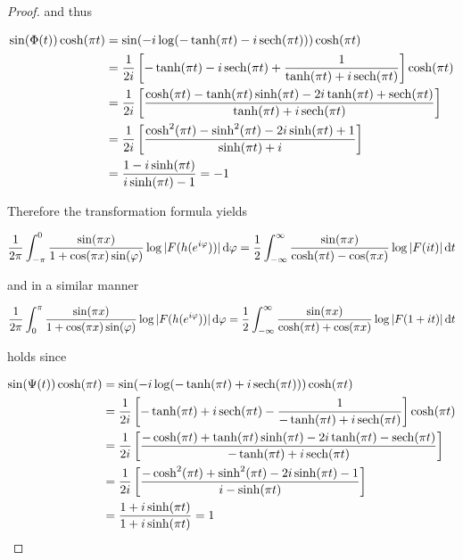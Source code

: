 \begin{proof}
\noindent and thus

\begin{gather*}
	\begin{aligned}
		\sin( \Phi(t) )\cosh(\pi t) &= \sin( -i\log( -\tanh (\pi t) - i \sech(\pi t) )) \cosh(\pi t)\\
		&= \frac{1}{2i} \sbr[3]{ -\tanh(\pi t) - i\sech(\pi t) + \frac{1}{\tanh(\pi t) + i\sech(\pi t) }}\cosh(\pi t)\\
		&= \frac{1}{2i} \sbr[3]{ \frac{\cosh(\pi t) - \tanh(\pi t) \sinh(\pi t) - 2i\tanh(\pi t) + \sech(\pi t)}{\tanh(\pi t) + i\sech(\pi t)}}\\
		&= \frac{1}{2i} \sbr[3]{ \frac{\cosh^2(\pi t) - \sinh^2(\pi t) - 2i \sinh(\pi t) + 1}{\sinh(\pi t) + i}}\\
		&= \frac{1 - i\sinh(\pi t)}{i\sinh(\pi t) - 1} = -1
	\end{aligned}
\end{gather*}

Therefore the transformation formula yields

\begin{equation*}
	\frac{1}{2\pi} \int_{-\pi}^0 \frac{\sin(\pi x)}{1 + \cos(\pi x)\sin(\varphi)} \log \abs[0]{ F(h(e^{i\varphi}))} \d\varphi = \frac{1}{2}\int_{-\infty}^\infty\frac{\sin(\pi x)}{\cosh(\pi t) - \cos(\pi x)} \log\abs[0]{ F(it)} \d t
\end{equation*}
				
\noindent and in a similar manner
		
\begin{equation*}
	\frac{1}{2\pi} \int_0^\pi \frac{\sin(\pi x)}{1 + \cos(\pi x)\sin(\varphi)} \log \abs[0]{ F(h(e^{i\varphi}))} \d\varphi = \frac{1}{2}\int_{-\infty}^\infty\frac{\sin(\pi x)}{\cosh(\pi t) + \cos(\pi x)} \log\abs[0]{ F(1 + it) } \d t
\end{equation*}

\noindent holds since

\begin{gather*}
	\begin{aligned}
		\sin(\Psi(t))\cosh(\pi t) &= \sin( -i\log( -\tanh (\pi t) + i \sech(\pi t) )) \cosh(\pi t)\\
		&= \frac{1}{2i} \sbr[3]{ -\tanh(\pi t) + i\sech(\pi t) - \frac{1}{-\tanh(\pi t) + i\sech(\pi t) }}\cosh(\pi t)\\
		&= \frac{1}{2i} \sbr[3]{ \frac{-\cosh(\pi t) + \tanh(\pi t) \sinh(\pi t) - 2i\tanh(\pi t) - \sech(\pi t)}{-\tanh(\pi t) + i\sech(\pi t)}}\\
		&= \frac{1}{2i} \sbr[3]{ \frac{- \cosh^2(\pi t) + \sinh^2(\pi t) - 2i \sinh(\pi t) - 1}{i - \sinh(\pi t)}}\\
		&= \frac{1 + i\sinh(\pi t)}{1 + i\sinh(\pi t)} = 1
	\end{aligned}
\end{gather*}


\end{proof}
